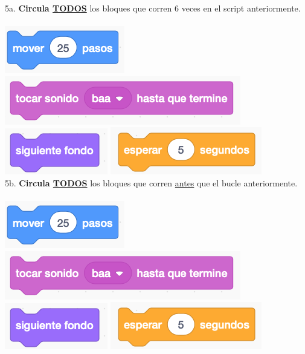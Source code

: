 \documentclass[letterpaper,12pt]{article}
\begin{document}
\noindent 5a. \textbf{Circula \underline{TODOS}} los bloques que corren 6 veces en el script anteriormente. \\ \\
\includegraphics[scale=.8]{q5_script1.png} \hspace{1cm}
\includegraphics[scale=.8]{q5_script2.png} \hspace{1cm}
\includegraphics[scale=.8]{q5_script3.png} \hspace{1cm}
\includegraphics[scale=.8]{q5_script4.png} \hspace{1cm}\\

\noindent 5b. \textbf{Circula \underline{TODOS}} los bloques que corren \underline{antes} que el bucle anteriormente.  \\ \\
\includegraphics[scale=.8]{q5_script1.png} \hspace{1cm}
\includegraphics[scale=.8]{q5_script2.png} \hspace{1cm}
\includegraphics[scale=.8]{q5_script3.png} \hspace{1cm}
\includegraphics[scale=.8]{q5_script4.png} \hspace{1cm}\\
\end{document}
